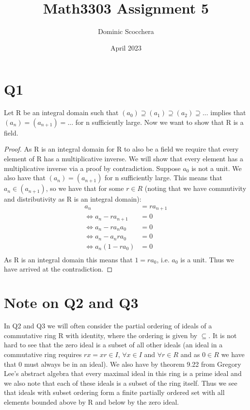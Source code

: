 \documentclass{article}
\title{Math3303 Assignment 5}
\author{Dominic Scocchera}
\date{April 2023}
\theoremstyle{definition}
\begin{document}
\maketitle
\section*{Q1}
Let R be an integral domain such that $(a_0)\supseteq(a_1)\supseteq(a_2)\supseteq...$ implies that $(a_n)=(a_{n+1})=...$ for n sufficiently large. Now we want to show that R is a field.
\begin{proof}
As R is an integral domain for R to also be a field we require that every element of R has a multiplicative inverse. We will show that every element has a multiplicative inverse via a proof by contradiction. Suppose $a_0$ is not a unit. We also have that $(a_n)=(a_{n+1})$ for n sufficiently large. This means that $a_n\in(a_{n+1})$, so we have that for some $r\in R$ (noting that we have commutivity and distributivity as R is an integral domain):
\begin{align*}
a_n&=ra_{n+1}\\
\iff a_n-ra_{n+1}&=0\\
\iff a_n-ra_na_0&=0\\
\iff a_n-a_nra_0&=0\\
\iff a_n(1-ra_0)&=0\\
\end{align*}
As R is an integral domain this means that $1=ra_0$, i.e. $a_0$ is a unit. Thus we have arrived at the contradiction.  
\end{proof}
\section*{Note on Q2 and Q3}
In Q2 and Q3 we will often consider the partial ordering of ideals of a commutative ring R with identity, where the ordering is given by $\subseteq$. It is not hard to see that the zero ideal is a subset of all other ideals (an ideal in a commutative ring requires $rx=xr\in I$, $\forall x\in I$ and $\forall r\in R$ and as $0\in R$ we have that 0 must always be in an ideal). We also have by theorem 9.22 from Gregory Lee's abstract algebra that every maximal ideal in this ring is a prime ideal and we also note that each of these ideals is a subset of the ring itself. Thus we see that ideals with subset ordering form a finite partially ordered set with all elements bounded above by R and below by the zero ideal.
\end{document}
